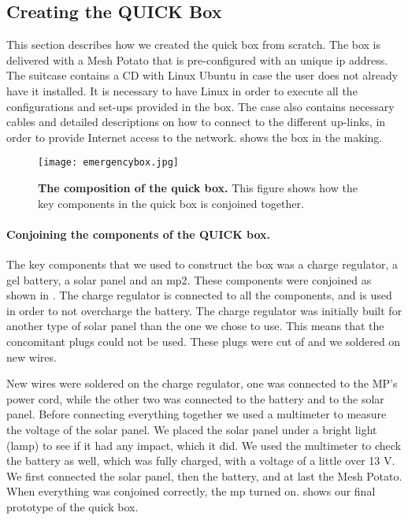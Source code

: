 \clearpage

\subsection{Creating the QUICK Box}
This section describes how we created the \gls{quick} box from scratch. The box is delivered with a Mesh Potato that is pre-configured with an unique \gls{ip} address. The suitcase contains a CD with Linux Ubuntu in case the user does not already have it installed. It is necessary to have Linux in order to execute all the configurations and set-ups provided in the box. The case also contains necessary cables and detailed descriptions on how to connect to the different up-links, in order to provide Internet access to the network.  shows the box in the making.


\begin{figure}[b]
  \centering
      \texttt{[image: emergencybox.jpg]}
  \caption [The composition of the \gls{quick} box]{\textbf{The composition of the \gls{quick} box.} This figure shows how the key components in the \gls{quick} box is conjoined together.}
  \label{fig:emergencybox}
\end{figure}

\paragraph{Conjoining the components of the QUICK box.}
The key components that we used to construct the box was a charge regulator, a gel battery, a solar panel and an \gls{mp2}. These components were conjoined as shown in . The charge regulator is connected to all the components, and is used in order to not overcharge the battery. The charge regulator was initially built for another type of solar panel than the one we chose to use. This means that the concomitant plugs could not be used. These plugs were cut of and we soldered on new wires.  

New wires were soldered on the charge regulator, one was connected to the MP's power cord, while the other two was connected to the battery and to the solar panel. Before connecting everything together we used a multimeter to measure the voltage of the solar panel. We placed the solar panel under a bright light (lamp) to see if it had any impact, which it did. We used the multimeter to check the battery as well, which was fully charged, with a voltage of a little over 13 V. 
We first connected the solar panel, then the battery, and at last the Mesh Potato. When everything was conjoined correctly, the \gls{mp} turned on.  shows our final prototype of the \gls{quick} box. 


